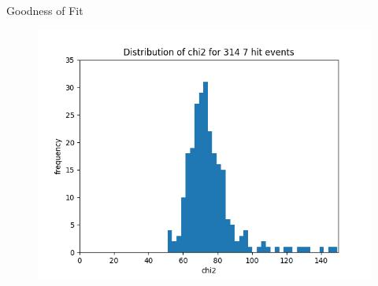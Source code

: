 \documentclass{beamer}
\begin{document}
\begin{frame}{Goodness of Fit}
\begin{minipage}{.49\textwidth}
    \begin{figure}[H]
	\centering
	\includegraphics[width=\textwidth]{chi2_secondlook.png}
    \end{figure}
    \end{minipage}
\end{frame}
\end{document}
